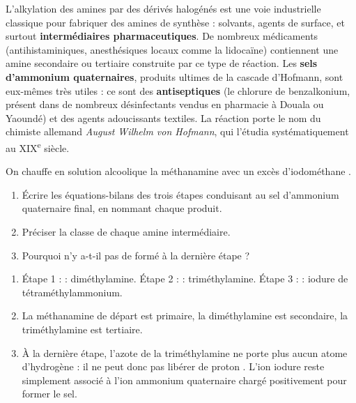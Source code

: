 \documentclass[11pt]{article}
\begin{document}
\begin{savaistu}
L'alkylation des amines par des dérivés halogénés est une voie industrielle classique pour fabriquer des amines de synthèse : solvants, agents de surface, et surtout \textbf{intermédiaires pharmaceutiques}. De nombreux médicaments (antihistaminiques, anesthésiques locaux comme la lidocaïne) contiennent une amine secondaire ou tertiaire construite par ce type de réaction. Les \textbf{sels d'ammonium quaternaires}, produits ultimes de la cascade d'Hofmann, sont eux-mêmes très utiles : ce sont des \textbf{antiseptiques} (le chlorure de benzalkonium, présent dans de nombreux désinfectants vendus en pharmacie à Douala ou Yaoundé) et des agents adoucissants textiles. La réaction porte le nom du chimiste allemand \emph{August Wilhelm von Hofmann}, qui l'étudia systématiquement au XIX\textsuperscript{e} siècle.
\end{savaistu}

\begin{exercice}
On chauffe en solution alcoolique la méthanamine  avec un excès d'iodométhane .
\begin{enumerate}
\item Écrire les équations-bilans des trois étapes conduisant au sel d'ammonium quaternaire final, en nommant chaque produit.
\item Préciser la classe de chaque amine intermédiaire.
\item Pourquoi n'y a-t-il pas de  formé à la dernière étape ?
\end{enumerate}
\end{exercice}

\begin{corrige}
\begin{enumerate}
\item Étape 1 :  : diméthylamine.
Étape 2 :  : triméthylamine.
Étape 3 :  : iodure de tétraméthylammonium.
\item La méthanamine de départ est primaire, la diméthylamine est secondaire, la triméthylamine est tertiaire.
\item À la dernière étape, l'azote de la triméthylamine ne porte plus aucun atome d'hydrogène : il ne peut donc pas libérer de proton . L'ion iodure  reste simplement associé à l'ion ammonium quaternaire chargé positivement pour former le sel.
\end{enumerate}
\end{corrige}
\end{document}
